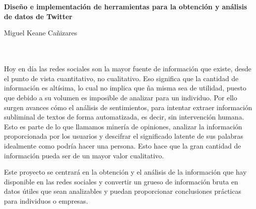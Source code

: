 \chapter*{}


%



\cleardoublepage
\thispagestyle{empty}

\begin{center}
{\large\bfseries Diseño e implementación de herramientas para la obtención y análisis de datos de Twitter}\\
\end{center}
\begin{center}
Miguel Keane Cañizares \\
\end{center}

\\

\vspace{0.7cm}
\\

Hoy en día las redes sociales son la mayor fuente de información que existe, desde el punto de vista cuantitativo, no cualitativo. Eso significa que la cantidad de información es altísima, lo cual no implica que ña misma sea de utilidad, puesto que debido a su volumen es imposible de analizar para un individuo. Por ello surgen avances cómo el análisis de sentimientos, para intentar extraer información subliminal de textos de forma automatizada, es decir, sin intervención humana. Esto es parte de lo que llamamos minería de opiniones, analizar la información proporcionada por los usuarios y descifrar el significado latente de sus palabras idealmente como podría hacer una persona. Esto hace que la gran cantidad de información pueda ser de un mayor valor cualitativo. 

Este proyecto se centrará en la obtención y el análisis de la información que hay disponible en las redes sociales y convertir un grueso de información bruta en datos útiles que sean analizables y puedan proporcionar conclusiones prácticas para individuos o empresas. 
\cleardoublepage


\thispagestyle{empty}


